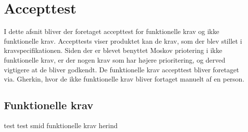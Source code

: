 \documentclass[Accepttestspecifikation/Accepttest_Main.tex]{subfiles}
\begin{document}
\section{Accepttest}
I dette afsnit bliver der foretaget accepttest for funktionelle krav og ikke funktionelle krav. Accepttests viser produktet kan de krav, som der blev stillet i kravspecifikationen. Siden der er blevet benyttet Moskov priotering i ikke funktionelle krav, er der nogen krav som har højere prioritering, og derved vigtigere at de bliver godkendt. De funktionelle krav accepttest bliver foretaget via. Gherkin, hvor de ikke funktionelle krav bliver fortaget manuelt af en person. 






\subsection{Funktionelle krav}
test test smid funktionelle krav herind
\end{document}

